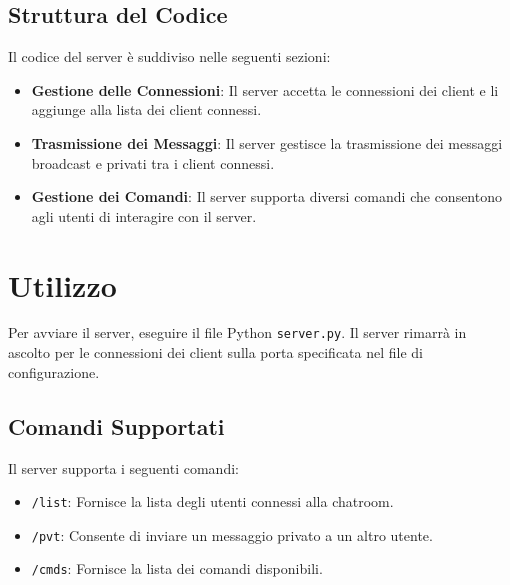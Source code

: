 \documentclass[a4paper,12pt]{report}
\begin{document}
\subsection{Struttura del Codice}
Il codice del server è suddiviso nelle seguenti sezioni:
\begin{itemize}
	\item \textbf{Gestione delle Connessioni}: Il server accetta le connessioni dei client e li aggiunge alla lista dei client connessi.
	\item \textbf{Trasmissione dei Messaggi}: Il server gestisce la trasmissione dei messaggi broadcast e privati tra i client connessi.
	\item \textbf{Gestione dei Comandi}: Il server supporta diversi comandi che consentono agli utenti di interagire con il server.
\end{itemize}
\section{Utilizzo}
Per avviare il server, eseguire il file Python \texttt{server.py}. Il server rimarrà in ascolto per le connessioni dei client sulla porta specificata nel file di configurazione.
\subsection{Comandi Supportati}
Il server supporta i seguenti comandi:
\begin{itemize}
	\item \texttt{/list}: Fornisce la lista degli utenti connessi alla chatroom.
	\item \texttt{/pvt}: Consente di inviare un messaggio privato a un altro utente.
	\item \texttt{/cmds}: Fornisce la lista dei comandi disponibili.
\end{itemize}
\end{document}
